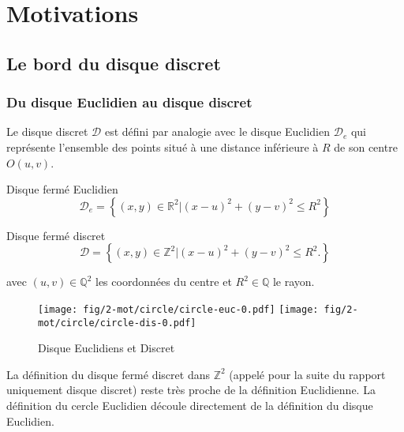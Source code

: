 \section{Motivations}

\subsection{Le bord du disque discret}

\subsubsection{Du disque Euclidien au disque discret}


Le disque discret $\mathcal{D}$ est défini par analogie avec le disque Euclidien $\mathcal{D}_e$ qui représente l'ensemble des points situé à une distance inférieure à $R$ de son centre $O(u,v)$.


\begin{Definition}{Disque fermé Euclidien}
\label{def:disk-euc}
 $$\mathcal{D}_e =  \left\{ (x,y) \in \mathbb{R}^{2} |  (x - u)^2 + (y - v)^2 \leq R^2 \right\}$$
\end{Definition}

\begin{Definition}{Disque fermé discret}
\label{def:disk-dis}
  $$\mathcal{D} =  \left\{ (x,y) \in \mathbb{Z}^{2} |  (x - u)^2 + (y - v)^2 \leq R^2. \right\}$$
  
  avec $(u,v) \in \mathbb{Q}^{2}$ les coordonnées du centre et $R^2 \in \mathbb{Q}$ le rayon.\\
\end{Definition}

\begin{figure}[H]
  \centering
  \texttt{[image: fig/2-mot/circle/circle-euc-0.pdf]}
  \texttt{[image: fig/2-mot/circle/circle-dis-0.pdf]}
  \caption{Disque Euclidiens et Discret}
\end{figure}

La définition du disque fermé discret dans $\mathbb{Z}^{2}$ (appelé pour la suite du rapport uniquement disque discret) reste très proche de la définition Euclidienne. La définition du cercle Euclidien découle directement de la définition du disque Euclidien.

